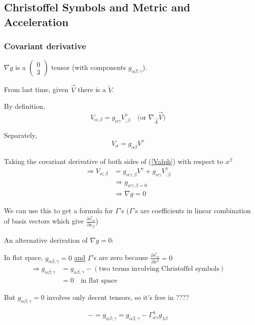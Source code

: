 \documentclass[a4paper]{article} %
\newcommand{\pmx}[1]{
\begin{pmatrix}
#1
\end{pmatrix}
}
\renewcommand{\tilde}{\widetilde}
\begin{document}
\subsection{Christoffel Symbols and Metric and Acceleration}
\subsubsection{Covariant derivative}
$\nabla g$ is a $\pmx{0\\3}$ tensor (with components $g_{\alpha\beta ; \gamma}$).

From last time, given $\vec{V}$ there is a $\tilde{V}$.

By definition,
\begin{equation}
V_{\alpha;\beta}=g_{\alpha\gamma} V^{\gamma}_{;\beta}\quad\text{(or $\nabla_{\vec{A}}\vec{V}$)}\label{product rule}
\end{equation}

Separately,
\begin{equation}
V_{\alpha}=g_{\alpha\beta}V^{\gamma}\label{Valph}
\end{equation}

Taking the covariant derivative of both sides of (\ref{Valph}) with respect to $x^{\beta}$
\begin{align}
\Rightarrow V_{\alpha;\beta}&=g_{\alpha\gamma;\beta}V^{\gamma}+g_{\alpha\gamma}V^{\gamma}_{;\beta}\\
&\Rightarrow g_{\alpha\gamma;\beta=0}\\
&\Rightarrow \nabla g=0
\end{align}

We can use this to get a formula for $\Gamma$'s ($\Gamma$'s are coefficients in linear combination of basis vectors which give $\frac{\partial \vec{e}_{\alpha}}{\partial x_{\beta}}$)

An alternative derivation of $\nabla g=0$:

In flat space, $g_{\alpha\beta , \gamma}=0$ \underline{and} $\Gamma$'s are zero because $\frac{\partial\vec{e}_{\alpha}}{\partial x^{\beta}}=0$
\begin{align}
\Rightarrow g_{\alpha\beta;\gamma}&=g_{\alpha\beta,\gamma}-(\text{two terms involving Christoffel symbols})\\
&=0 \quad\text{in flat space}
\end{align}

But $g_{\alpha\beta;\gamma}=0$ involves only decent tensors, so it's free in ????

\begin{equation}
-=g_{\alpha\beta;\gamma}=g_{\alpha\beta,\gamma}-\Gamma^{\lambda}_{\alpha\gamma}g_{\lambda\beta}
\end{equation}
\end{document}
